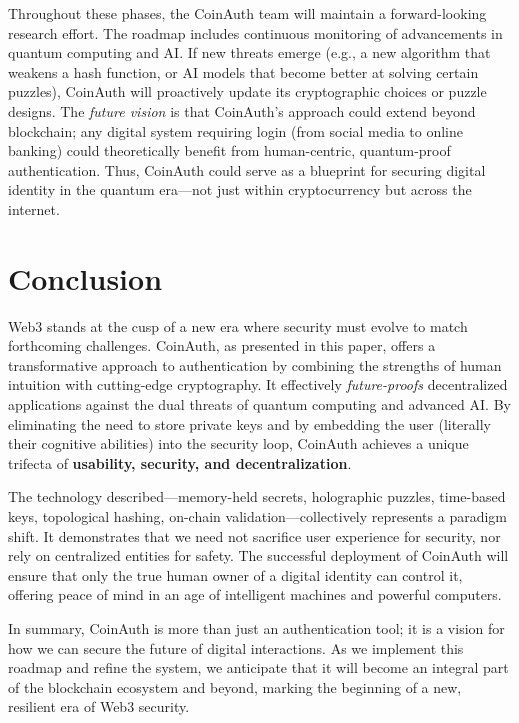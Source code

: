 \documentclass[10pt,letterpaper]{article}
\begin{document}
Throughout these phases, the CoinAuth team will maintain a forward-looking research effort. The roadmap includes continuous monitoring of advancements in quantum computing and AI. If new threats emerge (e.g., a new algorithm that weakens a hash function, or AI models that become better at solving certain puzzles), CoinAuth will proactively update its cryptographic choices or puzzle designs. The \emph{future vision} is that CoinAuth’s approach could extend beyond blockchain; any digital system requiring login (from social media to online banking) could theoretically benefit from human-centric, quantum-proof authentication. Thus, CoinAuth could serve as a blueprint for securing digital identity in the quantum era—not just within cryptocurrency but across the internet.

\section{Conclusion}
Web3 stands at the cusp of a new era where security must evolve to match forthcoming challenges. CoinAuth, as presented in this paper, offers a transformative approach to authentication by combining the strengths of human intuition with cutting-edge cryptography. It effectively \emph{future-proofs} decentralized applications against the dual threats of quantum computing and advanced AI. By eliminating the need to store private keys and by embedding the user (literally their cognitive abilities) into the security loop, CoinAuth achieves a unique trifecta of \textbf{usability, security, and decentralization}.

The technology described---memory-held secrets, holographic puzzles, time-based keys, topological hashing, on-chain validation---collectively represents a paradigm shift. It demonstrates that we need not sacrifice user experience for security, nor rely on centralized entities for safety. The successful deployment of CoinAuth will ensure that only the true human owner of a digital identity can control it, offering peace of mind in an age of intelligent machines and powerful computers.

In summary, CoinAuth is more than just an authentication tool; it is a vision for how we can secure the future of digital interactions. As we implement this roadmap and refine the system, we anticipate that it will become an integral part of the blockchain ecosystem and beyond, marking the beginning of a new, resilient era of Web3 security.
\end{document}
